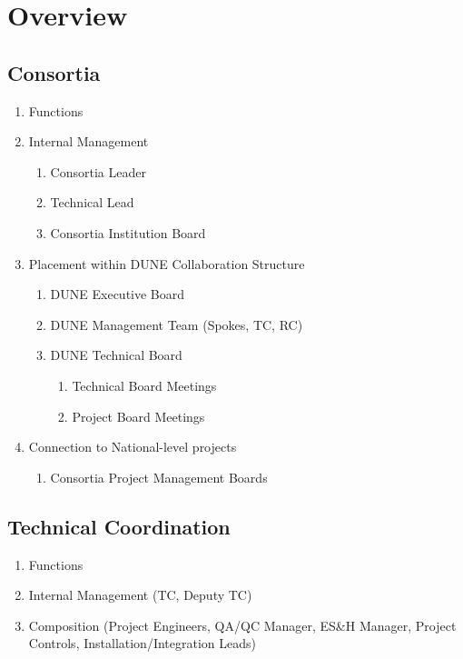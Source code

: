 \chapter{Overview}
\label{vl:tc-overview}

\section{ Consortia}

\begin{enumerate}
  \item Functions
  \item Internal Management
    \begin{enumerate}
      \item Consortia Leader
      \item Technical Lead
      \item Consortia Institution Board
    \end{enumerate}
  \item Placement within DUNE Collaboration Structure
    \begin{enumerate}
      \item DUNE Executive Board
      \item DUNE Management Team (Spokes, TC, RC)
      \item DUNE Technical Board
        \begin{enumerate}
          \item Technical Board Meetings
          \item Project Board Meetings
        \end{enumerate}
    \end{enumerate}
  \item Connection to National-level projects
     \begin{enumerate}
       \item Consortia Project Management Boards
     \end{enumerate}
\end{enumerate}

\section{ Technical Coordination}

\begin{enumerate}
  \item Functions
  \item Internal Management (TC, Deputy TC)
  \item Composition (Project Engineers, QA/QC Manager, ES\&H Manager,
    Project Controls, Installation/Integration Leads)
\end{enumerate}


